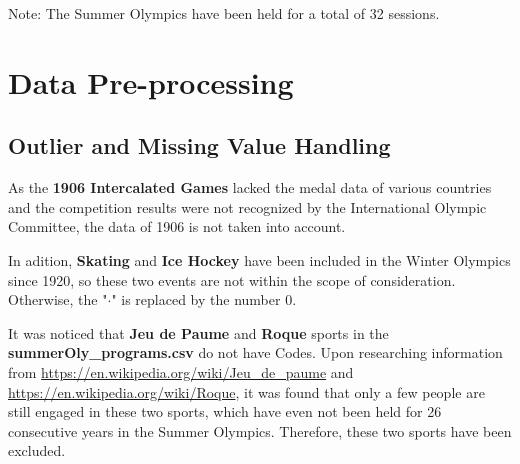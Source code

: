 \documentclass{mcmthesis}
\begin{document}
\noindent Note: The Summer Olympics have been held for a total of 32 sessions.
	
	
	
	
	
	
	
	
	
	\section{Data Pre-processing}
	
	\subsection{Outlier and Missing Value Handling}
	As the \textbf{1906 Intercalated Games} lacked the medal data of various countries and the competition results were not recognized by the International Olympic Committee, the data of 1906 is not taken into account.
	
	In adition, \textbf{Skating} and \textbf{Ice Hockey} have been included in the Winter Olympics since 1920, so these two events are not within the scope of consideration. Otherwise, the "$\cdot$" is replaced by the number $0$. 
	
	It was noticed that \textbf{Jeu de Paume} and \textbf{Roque} sports in the {\bf summerOly\_programs.csv} do not have Codes. Upon researching information from {\color{blue}\url{https://en.wikipedia.org/wiki/Jeu_de_paume}} and {\color{blue}\url{https://en.wikipedia.org/wiki/Roque}}, it was found that only a few people are still engaged in these two sports, which have even not been held for 26 consecutive years in the Summer Olympics. Therefore, these two sports have been excluded.
	
	
	
	
	
	
	
	
	
	
	
	
	
	
	
	
\end{document}
